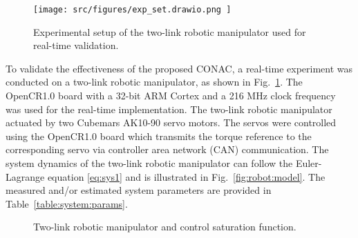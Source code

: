 \documentclass[journal]{IEEEtran}
\begin{document}
\begin{figure}[t]
    \centering
        \texttt{[image: 
            src/figures/exp\_set.drawio.png
        ]}%
    \caption{
        Experimental setup of the two-link robotic manipulator used for real-time validation.
    }
    \label{fig:ctrl:exp:set}
\end{figure}

To validate the effectiveness of the proposed CONAC, a real-time experiment was conducted on a two-link robotic manipulator, as shown in Fig.~\ref{fig:ctrl:exp:set}. 
The OpenCR1.0 board \cite{opencr} with a 32-bit ARM Cortex and a 216 MHz clock frequency was used for the real-time implementation.
The two-link robotic manipulator actuated by two Cubemars AK10-90 servo motors. 
The servos were controlled using the OpenCR1.0 board which transmits the torque reference to the corresponding servo via controller area network (CAN) communication.
The system dynamics of the two-link robotic manipulator can follow the Euler-Lagrange equation \eqref{eq:sys1} and is illustrated in Fig.~\ref{fig:robot:model}. 
The measured and/or estimated system parameters are provided in Table~\ref{table:system:params}. 

\begin{figure}[t]
    \centering
    \hfill
    \caption{Two-link robotic manipulator and control saturation function.}
    \label{fig:robot}
\end{figure}
\end{document}
